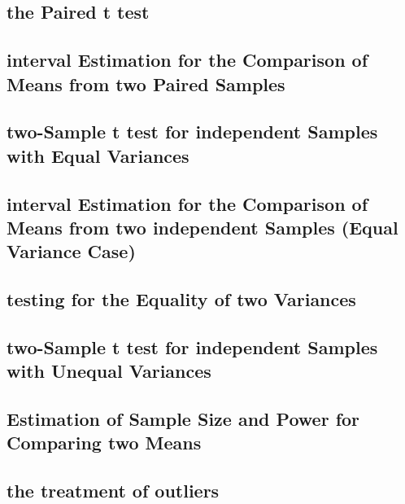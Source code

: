 \documentclass[12pt,]{article}
\theoremstyle{definition}
\theoremstyle{definition}
\theoremstyle{definition}
\theoremstyle{remark}
\begin{document}
\subsection{the Paired t test}\label{the-paired-t-test}

\subsection{interval Estimation for the Comparison of Means from two
Paired
Samples}\label{interval-estimation-for-the-comparison-of-means-from-two-paired-samples}

\subsection{two-Sample t test for independent Samples with Equal
Variances}\label{two-sample-t-test-for-independent-samples-with-equal-variances}

\subsection{interval Estimation for the Comparison of Means from two
independent Samples (Equal Variance
Case)}\label{interval-estimation-for-the-comparison-of-means-from-two-independent-samples-equal-variance-case}

\subsection{testing for the Equality of two
Variances}\label{testing-for-the-equality-of-two-variances}

\subsection{two-Sample t test for independent Samples with Unequal
Variances}\label{two-sample-t-test-for-independent-samples-with-unequal-variances}

\subsection{Estimation of Sample Size and Power for Comparing two
Means}\label{estimation-of-sample-size-and-power-for-comparing-two-means}

\subsection{the treatment of outliers}\label{the-treatment-of-outliers}
\end{document}
